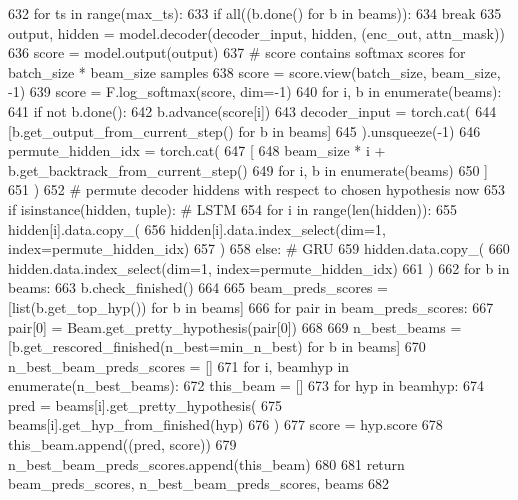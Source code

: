\begin{DoxyCode}
632         \textcolor{keywordflow}{for} ts \textcolor{keywordflow}{in} range(max\_ts):
633             \textcolor{keywordflow}{if} all((b.done() \textcolor{keywordflow}{for} b \textcolor{keywordflow}{in} beams)):
634                 \textcolor{keywordflow}{break}
635             output, hidden = model.decoder(decoder\_input, hidden, (enc\_out, attn\_mask))
636             score = model.output(output)
637             \textcolor{comment}{# score contains softmax scores for batch\_size * beam\_size samples}
638             score = score.view(batch\_size, beam\_size, -1)
639             score = F.log\_softmax(score, dim=-1)
640             \textcolor{keywordflow}{for} i, b \textcolor{keywordflow}{in} enumerate(beams):
641                 \textcolor{keywordflow}{if} \textcolor{keywordflow}{not} b.done():
642                     b.advance(score[i])
643             decoder\_input = torch.cat(
644                 [b.get\_output\_from\_current\_step() \textcolor{keywordflow}{for} b \textcolor{keywordflow}{in} beams]
645             ).unsqueeze(-1)
646             permute\_hidden\_idx = torch.cat(
647                 [
648                     beam\_size * i + b.get\_backtrack\_from\_current\_step()
649                     \textcolor{keywordflow}{for} i, b \textcolor{keywordflow}{in} enumerate(beams)
650                 ]
651             )
652             \textcolor{comment}{# permute decoder hiddens with respect to chosen hypothesis now}
653             \textcolor{keywordflow}{if} isinstance(hidden, tuple):  \textcolor{comment}{# LSTM}
654                 \textcolor{keywordflow}{for} i \textcolor{keywordflow}{in} range(len(hidden)):
655                     hidden[i].data.copy\_(
656                         hidden[i].data.index\_select(dim=1, index=permute\_hidden\_idx)
657                     )
658             \textcolor{keywordflow}{else}:  \textcolor{comment}{# GRU}
659                 hidden.data.copy\_(
660                     hidden.data.index\_select(dim=1, index=permute\_hidden\_idx)
661                 )
662         \textcolor{keywordflow}{for} b \textcolor{keywordflow}{in} beams:
663             b.check\_finished()
664 
665         beam\_preds\_scores = [list(b.get\_top\_hyp()) \textcolor{keywordflow}{for} b \textcolor{keywordflow}{in} beams]
666         \textcolor{keywordflow}{for} pair \textcolor{keywordflow}{in} beam\_preds\_scores:
667             pair[0] = Beam.get\_pretty\_hypothesis(pair[0])
668 
669         n\_best\_beams = [b.get\_rescored\_finished(n\_best=min\_n\_best) \textcolor{keywordflow}{for} b \textcolor{keywordflow}{in} beams]
670         n\_best\_beam\_preds\_scores = []
671         \textcolor{keywordflow}{for} i, beamhyp \textcolor{keywordflow}{in} enumerate(n\_best\_beams):
672             this\_beam = []
673             \textcolor{keywordflow}{for} hyp \textcolor{keywordflow}{in} beamhyp:
674                 pred = beams[i].get\_pretty\_hypothesis(
675                     beams[i].get\_hyp\_from\_finished(hyp)
676                 )
677                 score = hyp.score
678                 this\_beam.append((pred, score))
679             n\_best\_beam\_preds\_scores.append(this\_beam)
680 
681         \textcolor{keywordflow}{return} beam\_preds\_scores, n\_best\_beam\_preds\_scores, beams
682 
\end{DoxyCode}
